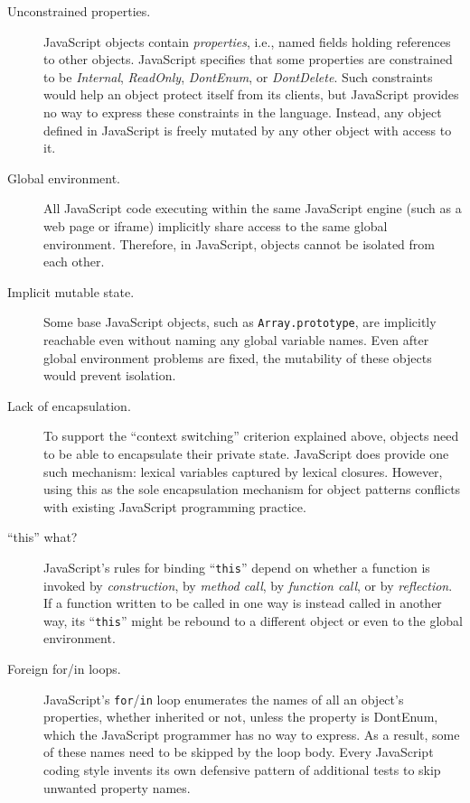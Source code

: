 \documentclass[letterpaper,twocolumn,10pt]{article}
\newcommand{\code}[1]{{\tt {#1}}}              %
\begin{document}
\begin{description}

  \item[Unconstrained properties.] JavaScript objects contain 
  \emph{properties}, i.e., named fields holding references to other objects. 
  JavaScript specifies that some properties are constrained to be 
  \emph{Internal}, \emph{ReadOnly}, \emph{DontEnum}, or \emph{DontDelete}. 
  Such constraints would help an object protect itself from its clients, but 
  JavaScript provides no way to express these constraints in the language. 
  Instead, any object defined in JavaScript is freely mutated by any other 
  object with access to it.
  
  \item[Global environment.] All JavaScript code executing within the same 
  JavaScript engine (such as a web page or iframe) implicitly share access to 
  the same global environment. Therefore, in JavaScript, objects cannot be 
  isolated from each other.

  \item[Implicit mutable state.] Some base JavaScript objects, such as 
  \code{Array.prototype}, are implicitly reachable even without naming any 
  global variable names. Even after global environment problems are fixed, 
  the mutability of these objects would prevent isolation.

  \item[Lack of encapsulation.] To support the ``context switching'' 
  criterion explained above, objects need to be able to encapsulate their 
  private state. JavaScript does provide one such mechanism: lexical 
  variables captured by lexical closures. However, using this as the sole 
  encapsulation mechanism for object patterns conflicts with existing 
  JavaScript programming practice.

  \item[``this'' what?] JavaScript's rules for binding ``\code{this}'' depend 
  on whether a function is invoked by \emph{construction}, by \emph{method 
  call}, by \emph{function call}, or by \emph{reflection}. If a function 
  written to be called in one way is instead called in another way, its 
  ``\code{this}'' might be rebound to a different object or even to the 
  global environment.

  \item[Foreign for/in loops.] JavaScript's \code{for}/\code{in} loop 
  enumerates the names of all an object's properties, whether inherited or 
  not, unless the property is DontEnum, which the JavaScript programmer has 
  no way to express. As a result, some of these names need to be skipped by 
  the loop body. Every JavaScript coding style invents its own defensive 
  pattern of additional tests to skip unwanted property names.
    

\end{description}
\end{document}
